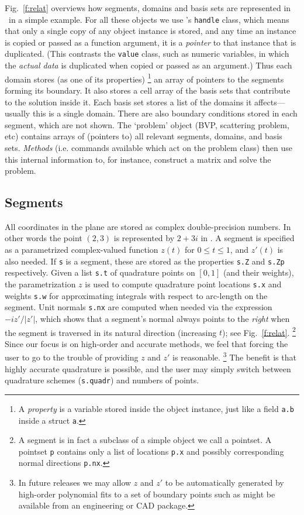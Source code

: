 \documentclass[12pt]{article}
\begin{document}
Fig.~\ref{f:relat} overviews how segments, domains and basis sets are
represented in \mpspack\ in a simple example.
For all these objects we use \matlab's {\tt handle} class,
which means that only a single copy of any object instance is
stored, and any time an instance is copied or passed as a function argument,
it is a {\em pointer} to that instance that is duplicated.
(This contrasts the {\tt value} class, such as numeric variables,
in which the {\em actual data} is duplicated when copied or passed as an
argument.)
Thus each domain stores (as one of its properties)%
  \footnote{A {\em property} is a variable stored inside the
    object instance, just like a field {\tt a.b} inside a struct {\tt a}.}
an array of pointers to the
segments forming its boundary.
It also stores a cell array of the basis sets that
contribute to the solution inside it.
Each basis set stores a list of the domains it affects---usually
this is a single domain.
There are also boundary conditions stored in
each segment, which are not shown.
The `problem' object (BVP, scattering problem, etc) contains arrays of
(pointers to) all relevant segments, domains, and basis sets.
{\em Methods} (i.e. commands available which act on the problem class)
then use this internal information to, for instance,
construct a matrix and solve the problem.

\subsection{Segments} %

All coordinates in the plane are stored as complex double-precision
numbers. In other words the point 
$(2,3)$ is represented by $2+3i$ in \mpspack.
A segment is specified as a parametrized complex-valued
function $z(t)$ for $0\le t\le 1$, and $z'(t)$ is also needed.
If {\tt s} is a segment, these are stored as the properties
{\tt s.Z} and {\tt s.Zp} respectively.
Given a list {\tt s.t} of quadrature points on $[0,1]$
(and their weights),
the parametrization $z$ is used to compute quadrature point locations
{\tt s.x} and weights {\tt s.w}
for approximating integrals with respect to arc-length on the segment.
Unit normals {\tt s.nx} are computed when needed via the expression $-iz'/|z'|$,
which shows that a segment's normal always points to the {\em right}
when the segment is traversed in its natural direction (increasing $t$);
see Fig.~\ref{f:relat}.%
  \footnote{A segment is in fact a
    subclass of a simple object we call a pointset.
    A pointset {\tt p} contains only a list of locations {\tt p.x}
    and possibly corresponding normal directions {\tt p.nx}.}
Since our focus is on high-order and accurate methods,
we feel that forcing the user to go to the trouble of providing $z$ and $z'$
is reasonable.%
  \footnote{In future releases we may allow $z$ and $z'$ to be automatically
    generated by high-order polynomial fits to a set of boundary points such
    as might be available from an engineering or CAD package.}
The benefit is that highly accurate quadrature is possible, and
the user may simply switch between quadrature schemes ({\tt s.quadr})
and numbers of points.
\end{document}
